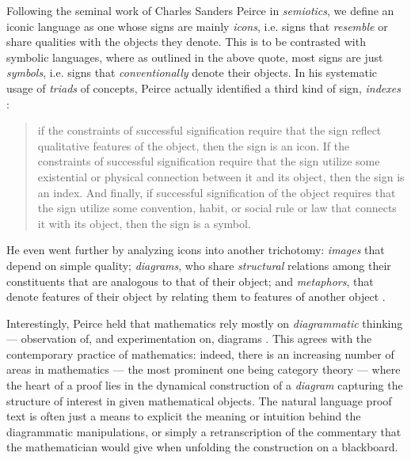 Following the seminal work of Charles Sanders Peirce in
\emph{semiotics}, we define an iconic language as one whose
signs are mainly \emph{icons}, i.e. signs that \emph{resemble} or share
qualities with the objects they denote. This is to be contrasted with symbolic
languages, where as outlined in the above quote, most signs are just
\emph{symbols}, i.e. signs that \emph{conventionally} denote their objects. In
his systematic usage of \emph{triads} of concepts, Peirce actually identified a
third kind of sign, \emph{indexes} :
\begin{quote}
  if the constraints of successful signification require that the sign reflect
  qualitative features of the object, then the sign is an icon. If the
  constraints of successful signification require that the sign utilize some
  existential or physical connection between it and its object, then the sign is
  an index. And finally, if successful signification of the object requires that
  the sign utilize some convention, habit, or social rule or law that connects
  it with its object, then the sign is a symbol.
\end{quote}
He even went further by analyzing icons into another
trichotomy:
\emph{images} that depend on simple quality; \emph{diagrams}, who share
\emph{structural} relations among their constituents that are analogous to that
of their object; and \emph{metaphors}, that denote features of their object by
relating them to features of another object .

Interestingly, Peirce held that mathematics rely mostly on \emph{diagrammatic}
thinking --- observation of, and experimentation on, diagrams
. This agrees with the contemporary
practice of mathematics: indeed, there is an increasing number of areas in
mathematics --- the most prominent one being category theory --- where the heart
of a proof lies in the dynamical construction of a \emph{diagram} capturing the
structure of interest in given mathematical objects. The natural language proof
text is often just a means to explicit the meaning or intuition behind the
diagrammatic manipulations, or simply a retranscription of the commentary that
the mathematician would give when unfolding the construction on a blackboard.

